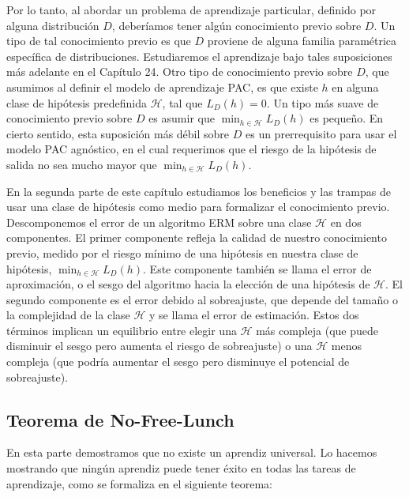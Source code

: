 Por lo tanto, al abordar un problema de aprendizaje particular, definido por alguna distribución $D$, deberíamos tener algún conocimiento previo sobre $D$. Un tipo de tal conocimiento previo es que $D$ proviene de alguna familia paramétrica específica de distribuciones. Estudiaremos el aprendizaje bajo tales suposiciones más adelante en el Capítulo 24. Otro tipo de conocimiento previo sobre $D$, que asumimos al definir el modelo de aprendizaje PAC, es que existe $h$ en alguna clase de hipótesis predefinida $\mathcal{H}$, tal que $L_D(h) = 0$. Un tipo más suave de conocimiento previo sobre $D$ es asumir que $\min_{h \in \mathcal{H}} L_D(h)$ es pequeño. En cierto sentido, esta suposición más débil sobre $D$ es un prerrequisito para usar el modelo PAC agnóstico, en el cual requerimos que el riesgo de la hipótesis de salida no sea mucho mayor que $\min_{h \in \mathcal{H}} L_D(h)$.

En la segunda parte de este capítulo estudiamos los beneficios y las trampas de usar una clase de hipótesis como medio para formalizar el conocimiento previo. Descomponemos el error de un algoritmo ERM sobre una clase $\mathcal{H}$ en dos componentes. El primer componente refleja la calidad de nuestro conocimiento previo, medido por el riesgo mínimo de una hipótesis en nuestra clase de hipótesis, $\min_{h \in \mathcal{H}} L_D(h)$. Este componente también se llama el error de aproximación, o el sesgo del algoritmo hacia la elección de una hipótesis de $\mathcal{H}$. El segundo componente es el error debido al sobreajuste, que depende del tamaño o la complejidad de la clase $\mathcal{H}$ y se llama el error de estimación. Estos dos términos implican un equilibrio entre elegir una $\mathcal{H}$ más compleja (que puede disminuir el sesgo pero aumenta el riesgo de sobreajuste) o una $\mathcal{H}$ menos compleja (que podría aumentar el sesgo pero disminuye el potencial de sobreajuste).

\subsection{Teorema de No-Free-Lunch}
En esta parte demostramos que no existe un aprendiz universal. Lo hacemos mostrando que ningún aprendiz puede tener éxito en todas las tareas de aprendizaje, como se formaliza en el siguiente teorema:

